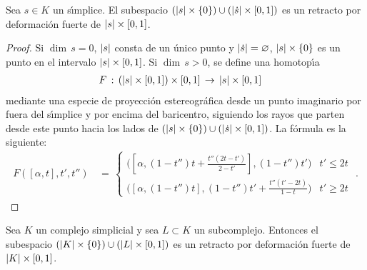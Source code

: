 \begin{lemaRetractoPorDeformacionSimplices}%
	\label{thm:retractopordeformacionsimplices}
	Sea $s\in K$ un s\'{\i}mplice. El subespacio
	$(\left|s\right|\times\{0\})\cup(\left|\dot{s}\right|\times\left[0,1\right])$ es un
	retracto por deformaci\'{o}n fuerte de $\left|s\right|\times\left[0,1\right]$.
\end{lemaRetractoPorDeformacionSimplices}

\begin{proof}
	Si $\dim\,s=0$, $\left|s\right|$ consta de un \'{u}nico punto y
	$\left|\dot{s}\right|=\varnothing$, $\left|s\right|\times\{0\}$ es un punto
	en el intervalo $\left|s\right|\times\left[0,1\right]$. Si $\dim\,s>0$, se
	define una homotop\'{\i}a
	\begin{align*}
		& F\,:\,(\left|s\right|\times\left[0,1\right])\times\left[0,1\right]
			\,\rightarrow\,\left|s\right|\times\left[0,1\right]
	\end{align*}
	mediante una especie de proyecci\'{o}n estereogr\'{a}fica desde un
	punto imaginario por fuera del s\'{\i}mplice y por encima del
	baricentro, siguiendo los rayos que parten desde este punto hacia
	los lados de
	$(\left|s\right|\times\{0\})\cup(\left|\dot{s}\right|\times\left[0,1\right])$.
	La f\'{o}rmula es la siguiente:
	\begin{align*}
		F([\alpha,t],t',t'') & \,=\,
			\begin{cases}
				\Big(\left[\alpha,(1-t'')t+
					\frac{t''(2t-t')}{2-t'}\right],
				(1-t'')t'\Big) & t'\leq 2t \\[10pt]
				\Big(\left[\alpha,(1-t'')t\right],
				(1-t'')t'+\frac{t''(t'-2t)}{1-t}\Big) &
					t'\geq 2t
			\end{cases}
			\text{ .}
	\end{align*}
\end{proof}

\begin{coroRetractoPorDeformacionComplejos}%
	\label{thm:retractopordeformacioncomplejos}
	Sea $K$ un complejo simplicial y sea $L\subset K$ un subcomplejo.
	Entonces el subespacio
	$(\left|K\right|\times\{0\})\cup(\left|L\right|\times\left[0,1\right])$ es un
	retracto por deformaci\'{o}n fuerte de $\left|K\right|\times\left[0,1\right]$.
\end{coroRetractoPorDeformacionComplejos}

